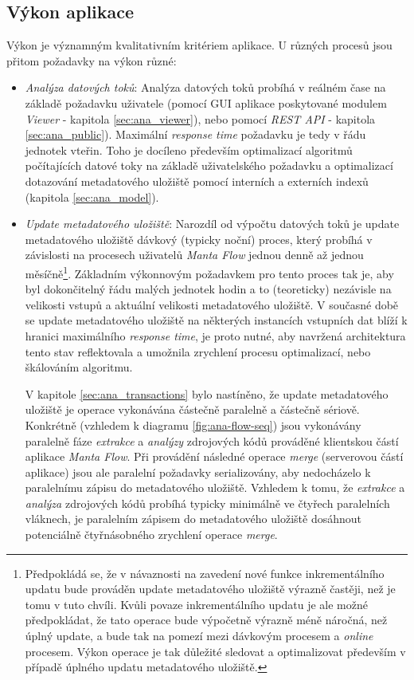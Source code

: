 \subsection{Výkon aplikace}
\label{sec:ana_performance}
Výkon je významným kvalitativním kritériem aplikace. U různých procesů jsou přitom požadavky na výkon různé:
\begin{itemize}
	\item{\textit{Analýza datových toků}}: Analýza datových toků probíhá v reálném čase na základě požadavku uživatele (pomocí GUI aplikace poskytované modulem \textit{Viewer} - kapitola \ref{sec:ana_viewer}), nebo pomocí \textit{REST API} - kapitola \ref{sec:ana_public}). Maximální \textit{response time} požadavku je tedy v řádu jednotek vteřin. Toho je docíleno především optimalizací algoritmů počítajících datové toky na základě uživatelského požadavku a optimalizací dotazování metadatového uložiště pomocí interních a externích indexů (kapitola \ref{sec:ana_model}).

	\item{\textit{Update metadatového uložiště}}: Narozdíl od výpočtu datových toků je update metadatového uložiště dávkový (typicky noční) proces, který probíhá v závislosti na procesech uživatelů \textit{Manta Flow} jednou denně až jednou měsíčně\footnote{Předpokládá se, že v návaznosti na zavedení nové funkce inkrementálního updatu \cite{Sykora17} bude prováděn update metadatového uložiště výrazně častěji, než je tomu v tuto chvíli. Kvůli povaze inkrementálního updatu je ale možné předpokládat, že tato operace bude výpočetně výrazně méně náročná, než úplný update, a bude tak na pomezí mezi dávkovým procesem a \textit{online} procesem. Výkon operace je tak důležité sledovat a optimalizovat především v případě úplného updatu metadatového uložiště.}. Základním výkonnovým požadavkem pro tento proces tak je, aby byl dokončitelný řádu malých jednotek hodin a to (teoreticky) nezávisle na velikosti vstupů a aktuální velikosti metadatového uložiště. V současné době se update metadatového uložiště na některých instancích vstupních dat blíží k hranici maximálního \textit{response time}, je proto nutné, aby navržená architektura tento stav reflektovala a umožnila zrychlení procesu optimalizací, nebo škálováním algoritmu.

	V kapitole \ref{sec:ana_transactions} bylo nastíněno, že update metadatového uložiště je operace vykonávána částečně paralelně a částečně sériově. Konkrétně (vzhledem k diagramu \ref{fig:ana-flow-seq}) jsou vykonávány paralelně fáze \textit{extrakce} a \textit{analýzy} zdrojových kódů prováděné klientskou částí aplikace \textit{Manta Flow}. Při provádění následné operace \textit{merge} (serverovou částí aplikace) jsou ale paralelní požadavky serializovány, aby nedocházelo k paralelnímu zápisu do metadatového uložiště. Vzhledem k tomu, že \textit{extrakce} a \textit{analýza} zdrojových kódů probíhá typicky minimálně ve čtyřech paralelních vláknech, je paralelním zápisem do metadatového uložiště dosáhnout potenciálně čtyřnásobného zrychlení operace \textit{merge}.


\end{itemize}
